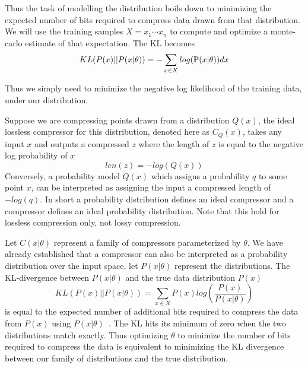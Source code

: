\documentclass[../main.tex]{subfiles}
\begin{document}
Thus the task of modelling the distribution boils down to minimizing the expected number of bits required to compress data drawn from that distribution. We will use the training samples $X={x_1 \cdots x_n}$ to compute and optimize a monte-carlo estimate of that expectation. The KL becomes 
\begin{equation}
    \label{eq:mc_kl}
    KL(P(x) || P(x|\theta)) = -\sum_{x \in X} log{(\mathbb{P}_{}(x|\theta))} dx
\end{equation}{}

Thus we simply need to minimize the negative log likelihood of the training data, under our distribution. 


Suppose we are compressing points drawn from a distribution $Q(x)$, the ideal lossless compressor for this distribution, denoted here as $C_Q(x)$, takes any input $x$ and outputs a compressed $z$ where the length of $z$ is equal to the negative log probability of $x$
\begin{equation}
    \label{eq:compression}
    len(z) = -log(Q(x))   
\end{equation}{}
Conversely, a probability model $Q(x)$ which assigns a probability $q$ to some point $x$, can be interpreted as assigning the input a compressed length of $-log(q)$. In short a probability distribution defines an ideal compressor and a compressor defines an ideal probability distribution. Note that this hold for lossless compression only, not lossy compression.  

Let $C(x|\theta)$ represent a family of compressors parameterized by $\theta$. We have already established that a compressor can also be interpreted as a probability distribution over the input space, let $P(x|\theta)$ represent the distributions. The KL-divergence between $P(x|\theta)$ and the true data distribution $P(x)$
\begin{equation}
    KL(P(x) || P(x|\theta)) = \sum_{x \in X}{P(x) log(\frac{P(x)}{P(x|\theta)})}
\end{equation}{}
is equal to the expected number of additional bits required to compress the data from $P(x)$ using $P(x|\theta)$~\citep[chapter~5]{mackay2003information}. The KL hits its minimum of zero when the two distributions match exactly. Thus optimizing $\theta$ to minimize the number of bits required to compress the data is equivalent to minimizing the KL divergence between our family of distributions and the true distribution. 

\end{document}
